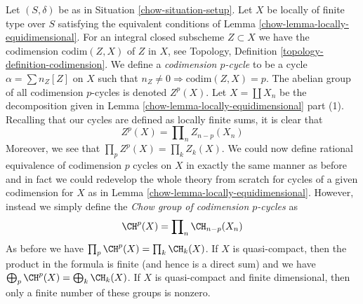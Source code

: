 Let $(S, \delta)$ be as in Situation \ref{chow-situation-setup}. Let $X$ be
locally of finite type over $S$ satisfying the equivalent
conditions of Lemma \ref{chow-lemma-locally-equidimensional}. For an integral
closed subscheme $Z \subset X$ we have the codimension $\text{codim}(Z, X)$
of $Z$ in $X$, see Topology, Definition \ref{topology-definition-codimension}.
We define a {\it codimension $p$-cycle} to be a cycle $\alpha = \sum n_Z[Z]$
on $X$ such that $n_Z \not = 0 \Rightarrow \text{codim}(Z, X) = p$.
The abelian group of all codimension $p$-cycles is denoted $Z^p(X)$.
Let $X = \coprod X_n$ be the decomposition given in
Lemma \ref{chow-lemma-locally-equidimensional} part (1).
Recalling that our cycles are defined as locally finite sums, it is clear that
$$
Z^p(X) = \prod\nolimits_n Z_{n - p}(X_n)
$$
Moreover, we see that $\prod_p Z^p(X) = \prod_k Z_k(X)$. We could now define
rational equivalence of codimension $p$ cycles on $X$ in exactly the same
manner as before and in fact we could redevelop the whole theory from scratch
for cycles of a given codimension for $X$ as in
Lemma \ref{chow-lemma-locally-equidimensional}. However, instead we simply
define the {\it Chow group of codimension $p$-cycles} as
$$
\CH^p(X) = \prod\nolimits_n \CH_{n - p}(X_n)
$$
As before we have $\prod_p \CH^p(X) = \prod_k \CH_k(X)$.
If $X$ is quasi-compact, then the product in the formula is finite
(and hence is a direct sum) and we have
$\bigoplus_p \CH^p(X) = \bigoplus_k \CH_k(X)$. If $X$ is quasi-compact
and finite dimensional, then only a finite number of these groups
is nonzero.

